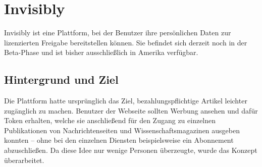 \section{Invisibly}
Invisibly ist eine Plattform, bei der Benutzer ihre persönlichen Daten zur lizenzierten Freigabe bereitstellen können. Sie befindet sich derzeit noch in der Beta-Phase und ist bisher ausschließlich in Amerika verfügbar.

\subsection{Hintergrund und Ziel}
Die Plattform hatte ursprünglich das Ziel, bezahlungspflichtige Artikel leichter zugänglich zu machen. Benutzer der Webseite sollten Werbung ansehen und dafür Token erhalten, welche sie anschließend für den Zugang zu einzelnen Publikationen von Nachrichtenseiten und Wissenschaftsmagazinen ausgeben konnten -- ohne bei den einzelnen Diensten beispielsweise ein Abonnement abzuschließen. Da diese Idee nur wenige Personen überzeugte, wurde das Konzept überarbeitet. \cite{techRadarInvisibly_2021} \newline

